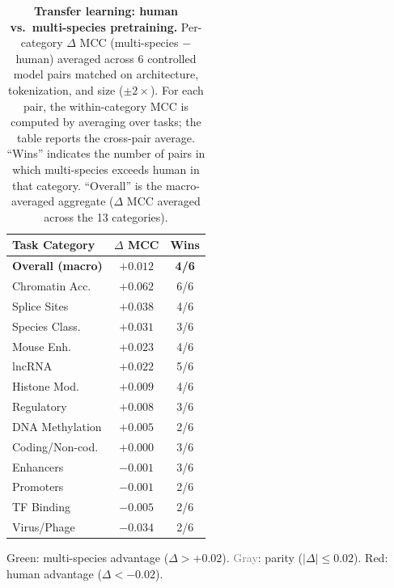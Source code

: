 \documentclass{article}
\theoremstyle{plain}
\theoremstyle{definition}
\theoremstyle{remark}
\begin{document}
\begin{table}[h]
\centering
\caption{\textbf{Transfer learning: human vs.\ multi-species pretraining.}
Per-category $\Delta$ MCC (multi-species $-$ human) averaged across
6 controlled model pairs matched on architecture, tokenization, and
size ($\pm 2\times$). For each pair, the within-category MCC is
computed by averaging over tasks; the table reports the cross-pair
average. ``Wins'' indicates the number of pairs in which multi-species
exceeds human in that category. ``Overall'' is the macro-averaged
aggregate ($\Delta$ MCC averaged across the 13 categories).}
\label{tab:transfer_human_multi}
\small
\begin{tabular}{lcc}
\toprule
\textbf{Task Category} & \textbf{$\Delta$ MCC} & \textbf{Wins} \\
\midrule
\textbf{Overall (macro)}   & $\mathbf{+0.012}$ & \textbf{4/6} \\
\midrule
\rowcolor{green!15} Chromatin Acc.    & $+0.062$ & 6/6 \\
\rowcolor{green!15} Splice Sites      & $+0.038$ & 4/6 \\
\rowcolor{green!15} Species Class.    & $+0.031$ & 3/6 \\
\rowcolor{green!15} Mouse Enh.        & $+0.023$ & 4/6 \\
\rowcolor{green!15} lncRNA            & $+0.022$ & 5/6 \\
\rowcolor{gray!10}  Histone Mod.      & $+0.009$ & 4/6 \\
\rowcolor{gray!10}  Regulatory        & $+0.008$ & 3/6 \\
\rowcolor{gray!10}  DNA Methylation   & $+0.005$ & 2/6 \\
\rowcolor{gray!10}  Coding/Non-cod.   & $+0.000$ & 3/6 \\
\rowcolor{gray!10}  Enhancers         & $-0.001$ & 3/6 \\
\rowcolor{gray!10}  Promoters         & $-0.001$ & 2/6 \\
\rowcolor{gray!10}  TF Binding        & $-0.005$ & 2/6 \\
\rowcolor{red!15}   Virus/Phage       & $-0.034$ & 2/6 \\
\bottomrule
\end{tabular}
\vspace{1mm}
\begin{flushleft}
\footnotesize
\textcolor{green!50!black}{Green}: multi-species advantage ($\Delta > +0.02$).
\textcolor{gray}{Gray}: parity ($|\Delta| \leq 0.02$).
\textcolor{red!70!black}{Red}: human advantage ($\Delta < -0.02$).
\end{flushleft}
\end{table}
\end{document}
